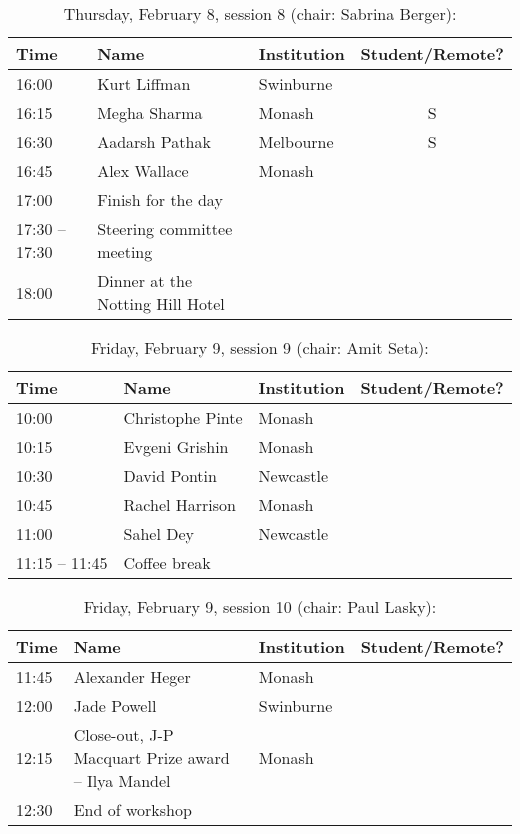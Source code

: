 \documentclass[amsmath,onecolumn]{revtex4-1}
\begin{document}
\begin{table}[!htbp]
	\centering
	\caption{Thursday, February 8, session 8 (chair: Sabrina Berger):}
\begin{tabular}{| l | l | l | c |}
	\hline
	Time & Name  & Institution & Student/Remote? \\ 		
	\hline
	16:00 & Kurt	Liffman & Swinburne & \\
	16:15 & Megha	Sharma & Monash & S \\
	16:30 & Aadarsh	Pathak & Melbourne & S \\ 
	16:45 & Alex	Wallace & Monash& \\
	\hline
	17:00 & Finish for the day & & \\
	\hline
	17:30 -- 17:30 & Steering committee meeting & & \\
	18:00 & Dinner at the Notting Hill Hotel & & \\
	\hline
\end{tabular}
\end{table}

\begin{table}[!htbp]
	\centering
	\caption{Friday, February 9, session 9 (chair: Amit Seta):}
\begin{tabular}{| l | l | l | c |}
	\hline
	Time & Name  & Institution & Student/Remote? \\ 		
	\hline
	10:00 & Christophe 	Pinte & Monash & \\
	10:15 & Evgeni	Grishin & Monash & \\
	10:30 & David	Pontin & Newcastle & \\
	10:45 & Rachel Harrison & Monash & \\
	11:00 & Sahel	Dey & Newcastle & \\
	\hline
	11:15 -- 11:45 & Coffee break & & \\
	\hline
\end{tabular}
\end{table}

\begin{table}[!htbp]
	\centering
	\caption{Friday, February 9, session 10 (chair: Paul Lasky):}
\begin{tabular}{| l | l | l | c |}
	\hline
	Time & Name  & Institution & Student/Remote? \\ 		
	\hline
	11:45 & Alexander	Heger & Monash & \\
	12:00 &  Jade	Powell & Swinburne & \\
	12:15 & Close-out, J-P Macquart Prize award -- Ilya Mandel & Monash & \\
	\hline
	12:30 & End of workshop & & \\
	\hline
\end{tabular}
\end{table}
\end{document}
